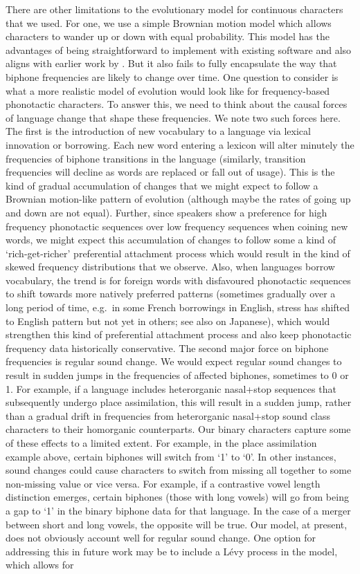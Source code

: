 There are other limitations to the evolutionary model for continuous characters that we used. For one, we use a simple Brownian motion model which allows characters to wander up or down with equal probability. This model has the advantages of being straightforward to implement with existing software and also aligns with earlier work by \textcite{macklin-cordes_phylogenetic_2021}. But it also fails to fully encapsulate the way that biphone frequencies are likely to change over time. One question to consider is what a more realistic model of evolution would look like for frequency-based phonotactic characters. To answer this, we need to think about the causal forces of language change that shape these frequencies. We note two such forces here. The first is the introduction of new vocabulary to a language via lexical innovation or borrowing. Each new word entering a lexicon will alter minutely the frequencies of biphone transitions in the language (similarly, transition frequencies will decline as words are replaced or fall out of usage). This is the kind of gradual accumulation of changes that we might expect to follow a Brownian motion-like pattern of evolution (although maybe the rates of going up and down are not equal). Further, since speakers show a preference for high frequency phonotactic sequences over low frequency sequences when coining new words, we might expect this accumulation of changes to follow some a kind of `rich-get-richer' preferential attachment process which would result in the kind of skewed frequency distributions that we observe. Also, when languages borrow vocabulary, the trend is for foreign words with disfavoured phonotactic sequences to shift towards more natively preferred patterns (sometimes gradually over a long period of time, e.g.~in some French borrowings in English, stress has shifted to English pattern but not yet in others; see also \textcite{crawford_adaptation_2009} on Japanese), which would strengthen this kind of preferential attachment process and also keep phonotactic frequency data historically conservative. The second major force on biphone frequencies is regular sound change. We would expect regular sound changes to result in sudden jumps in the frequencies of affected biphones, sometimes to 0 or 1. For example, if a language includes heterorganic nasal+stop sequences that subsequently undergo place assimilation, this will result in a sudden jump, rather than a gradual drift in frequencies from heterorganic nasal+stop sound class characters to their homorganic counterparts. Our binary characters capture some of these effects to a limited extent. For example, in the place assimilation example above, certain biphones will switch from `1' to `0'. In other instances, sound changes could cause characters to switch from missing all together to some non-missing value or vice versa. For example, if a contrastive vowel length distinction emerges, certain biphones (those with long vowels) will go from being a gap to `1' in the binary biphone data for that language. In the case of a merger between short and long vowels, the opposite will be true. Our model, at present, does not obviously account well for regular sound change. One option for addressing this in future work may be to include a Lévy process in the model, which allows for 